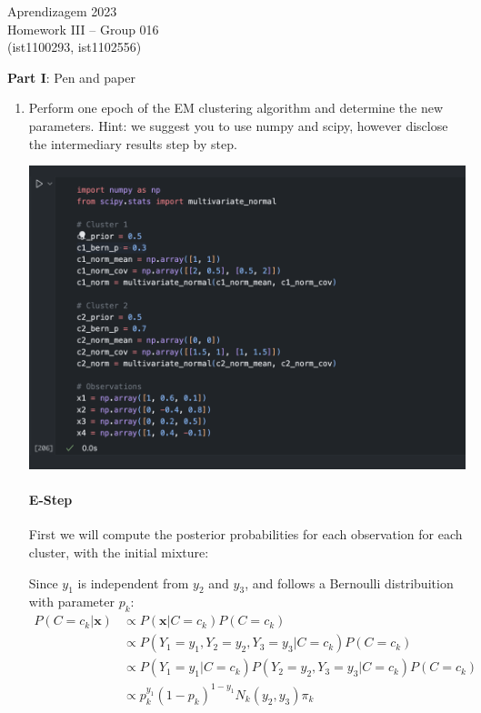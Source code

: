 \documentclass[12pt]{article}
\begin{document}
\newcommand{\prob}{\textrm{P}}
\newcommand{\ind}{\perp\!\!\!\!\!\perp} 
\newcommand{\notind}{\not\perp\!\!\!\!\!\perp}
\newcommand{\defeq}{\vcentcolon=}

\center
Aprendizagem 2023\\
Homework III -- Group 016\\
(ist1100293, ist1102556)\vskip 1cm

\large{\textbf{Part I}: Pen and paper}\normalsize

\begin{enumerate}[leftmargin=\labelsep]
    \item Perform one epoch of the EM clustering algorithm and determine the new parameters.
    Hint: we suggest you to use numpy and scipy, however disclose the intermediary results step by step.

    \begin{center}
        \includegraphics[scale=0.5]{images/code1.png}
    \end{center}

    \paragraph{E-Step} First we will compute the posterior probabilities for each observation for each cluster, with the initial mixture:

    Since $y_1$ is independent from $y_2$ and $y_3$, and follows a Bernoulli distribuition with parameter $p_k$:
    \begin{equation}
    \begin{aligned}
        P(C=c_k|\mathbf{x}) &\propto P(\mathbf{x}|C=c_k)P(C=c_k) \\
        &\propto P(Y_1 = y_1, Y_2 = y_2, Y_3= y_3|C=c_k)P(C=c_k) \\
        &\propto P(Y_1 = y_1|C=c_k)P(Y_2 = y_2, Y_3=y_3|C=c_k)P(C=c_k) \\
        &\propto p_k^{y_1}(1-p_k)^{1-y_1}N_k(y_2, y_3)\pi_k
    \end{aligned}
    \end{equation}


\end{enumerate}
\end{document}
